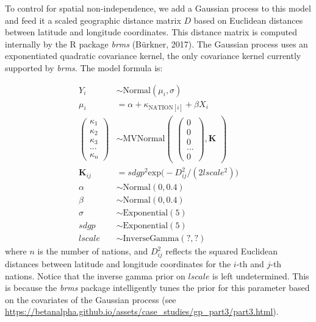\documentclass[english,man,floatsintext]{apa6}
\begin{document}
\newpage

To control for spatial non-independence, we add a Gaussian process to this model and feed it a scaled geographic distance matrix \(D\) based on Euclidean distances between latitude and longitude coordinates. This distance matrix is computed internally by the R package \emph{brms} (Bürkner, 2017). The Gaussian process uses an exponentiated quadratic covariance kernel, the only covariance kernel currently supported by \emph{brms}. The model formula is:

\[
\begin{aligned}
Y_{i} &\sim \text{Normal}(\mu_{i},\sigma) \\
\mu_{i} &= \alpha + \kappa_{\text{NATION}[i]} + \beta X_{i} \\
\begin{pmatrix}
\kappa_{1} \\ \kappa_{2} \\ \kappa_{3} \\ ... \\ \kappa_{n}
\end{pmatrix} &\sim \text{MVNormal}
\begin{pmatrix}
\begin{pmatrix}
0 \\ 0 \\ 0 \\ ... \\ 0
\end{pmatrix},\textbf{K}
\end{pmatrix}\\
\textbf{K}_{ij} &= sdgp^2 \text{exp} \big (-D_{ij}^2 / (2 lscale^2) \big )\\
\alpha &\sim \text{Normal}(0, 0.4) \\
\beta &\sim \text{Normal}(0, 0.4) \\
\sigma &\sim \text{Exponential}(5) \\
sdgp &\sim \text{Exponential}(5) \\
lscale &\sim \text{InverseGamma}(?,?)
\end{aligned}
\]
where \(n\) is the number of nations, and \(D^2_{ij}\) reflects the squared Euclidean distances between latitude and longitude coordinates for the \(i\)-th and \(j\)-th nations. Notice that the inverse gamma prior on \(lscale\) is left undetermined. This is because the \emph{brms} package intelligently tunes the prior for this parameter based on the covariates of the Gaussian process (see \url{https://betanalpha.github.io/assets/case_studies/gp_part3/part3.html}).
\end{document}
